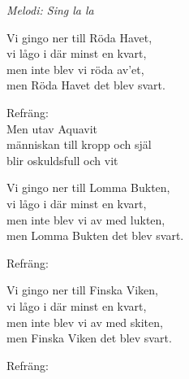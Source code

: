{\footnotesize\textit{Melodi: Sing la la}}\par
\vspace{10pt}
Vi gingo ner till Röda Havet,\\
vi lågo i där minst en kvart,\\
men inte blev vi röda av’et,\\
men Röda Havet det blev svart.\par
\vspace{10pt}
Refräng:\\
\revrpt Men utav Aquavit\\
människan till kropp och själ\\
blir oskuldsfull och vit\rpt\par
\vspace{10pt}
Vi gingo ner till Lomma Bukten,\\
vi lågo i där minst en kvart,\\
men inte blev vi av med lukten,\\
men Lomma Bukten det blev svart.\par
\vspace{10pt}
Refräng:\par
\vspace{10pt}
Vi gingo ner till Finska Viken,\\
vi lågo i där minst en kvart,\\
men inte blev vi av med skiten,\\
men Finska Viken det blev svart.\par
\vspace{10pt}
Refräng:

